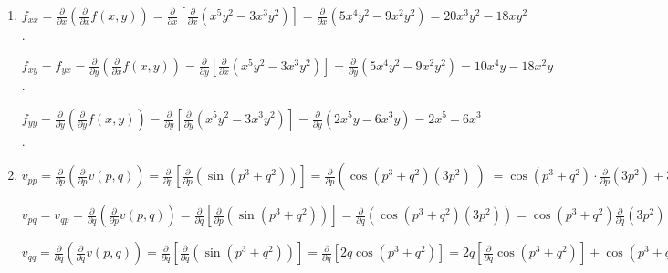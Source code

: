 \begin{Answer}[ref = second]
\begin{enumerate}
\item $f_{xx} = \frac{\partial}{\partial x} \left( \frac{\partial}{\partial x}
f(x, y) \right) = \frac{\partial}{\partial x} \left[ \frac{\partial}{\partial 
x} \left( x^5y^2 - 3x^3y^2 \right) \right] = \frac{\partial}{\partial x} \left(
5x^4y^2 - 9x^2y^2 \right) = 20x^3y^2 - 18xy^2$. 

$f_{xy} = f_{yx} = \frac{\partial}{\partial y} \left( \frac{\partial}{\partial 
x}f(x, y) \right) = \frac{\partial}{\partial y} \left[ \frac{\partial}{\partial
x} \left( x^5y^2 - 3x^3y^2 \right) \right] = \frac{\partial}{\partial y} \left(
5x^4y^2 - 9x^2y^2 \right) = 10x^4y - 18x^2y$. 

$f_{yy} = \frac{\partial}{\partial y} \left( \frac{\partial}{\partial y} 
f(x, y) \right) = \frac{\partial}{\partial y} \left[ \frac{\partial}{\partial 
y} \left( x^5y^2 - 3x^3y^2 \right) \right] = \frac{\partial}{\partial y} \left(
2x^5y - 6x^3y \right) = 2x^5 - 6x^3$. 

\item $v_{pp} = \frac{\partial}{\partial p} \left( \frac{\partial}{\partial p}
v(p, q) \right) = \frac{\partial}{\partial p} \left[ \frac{\partial}{\partial 
p} \left( \sin{ \left(p^3 + q^2 \right)} \right) \right] = \frac{\partial}{
\partial p} \left( \cos{ \left( p^3 + q^2 \right)} \left( 3p^2 \right) \left) 
= \cos{ \left(p^3 + q^2 \right)} \cdot \frac{\partial}{\partial p} \left( 3p^2 
\right) + 3p^2 \cdot \frac{\partial}{\partial p} \left(\cos{ \left(p^3 + q^2 
\right)}$

$v_{pq} = v_{qp} = \frac{\partial}{\partial q} \left( \frac{\partial}{\partial 
p} v(p, q) \right) = \frac{\partial}{\partial q} \left[ \frac{\partial}{
\partial p} \left( \sin{ \left(p^3 + q^2 \right)} \right) \right] = \frac{
\partial}{\partial q} \left( \cos{ \left( p^3 + q^2 \right)} \left( 3p^2 
\right) \right) = \cos{ \left( p^3 + q^2 \right)} \frac{\partial}{\partial q} 
\left( 3p^2 \right) + 3p^2 \frac{\partial}{\partial q} \cos{ \left( p^3 + q^2 
\right)} = 0 + 3p^2 \left(-\sin{ \left( p^3 + q^2 \right)} \right) \left( 
\frac{\partial}{\partial q} \left(p^3 + q^2 \right) \right) = -6 p^2 q \sin{ 
\left(p^3 + q^2 \right)}$

$v_{qq} = \frac{\partial}{\partial q} \left( \frac{\partial}{\partial q}v(p, q)
\right) = \frac{\partial}{\partial q} \left[ \frac{\partial}{\partial q} \left(
\sin{\left( p^3 + q^2 \right)} \right) \right] = \frac{\partial}{\partial q} 
\left[ 2q\cos{ \left(p^3 + q^2 \right)} \right] = 2q \left[ \frac{\partial}{
\partial q} \cos{ \left(p^3 + q^2 \right)} \right] + \cos{ \left( p^3 + q^2 
\right)} \left[ \frac{\partial}{\partial q} \left( 2q \right) \right] = \left( 
2q \right) \cdot \left[ -2q \sin{ \left(p^3 + q^2 \right)} \right] + 2\cos{ 
\left(p^3 + q^2 \right)} = 2\cos{ \left(p^3 + q^2 \right)} - 4q^2 \sin{ \left(
p^3 + q^2 \right)}$


\end{enumerate}
\end{Answer}
